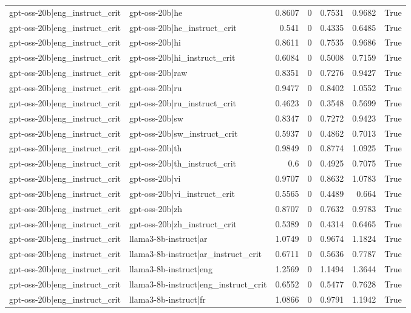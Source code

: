 \begin{table}
\begin{tabular}{l l r r r r l}
gpt-oss-20b|eng_instruct_crit & gpt-oss-20b|he & 0.8607 & 0 & 0.7531 & 0.9682 & True \\
gpt-oss-20b|eng_instruct_crit & gpt-oss-20b|he_instruct_crit & 0.541 & 0 & 0.4335 & 0.6485 & True \\
gpt-oss-20b|eng_instruct_crit & gpt-oss-20b|hi & 0.8611 & 0 & 0.7535 & 0.9686 & True \\
gpt-oss-20b|eng_instruct_crit & gpt-oss-20b|hi_instruct_crit & 0.6084 & 0 & 0.5008 & 0.7159 & True \\
gpt-oss-20b|eng_instruct_crit & gpt-oss-20b|raw & 0.8351 & 0 & 0.7276 & 0.9427 & True \\
gpt-oss-20b|eng_instruct_crit & gpt-oss-20b|ru & 0.9477 & 0 & 0.8402 & 1.0552 & True \\
gpt-oss-20b|eng_instruct_crit & gpt-oss-20b|ru_instruct_crit & 0.4623 & 0 & 0.3548 & 0.5699 & True \\
gpt-oss-20b|eng_instruct_crit & gpt-oss-20b|sw & 0.8347 & 0 & 0.7272 & 0.9423 & True \\
gpt-oss-20b|eng_instruct_crit & gpt-oss-20b|sw_instruct_crit & 0.5937 & 0 & 0.4862 & 0.7013 & True \\
gpt-oss-20b|eng_instruct_crit & gpt-oss-20b|th & 0.9849 & 0 & 0.8774 & 1.0925 & True \\
gpt-oss-20b|eng_instruct_crit & gpt-oss-20b|th_instruct_crit & 0.6 & 0 & 0.4925 & 0.7075 & True \\
gpt-oss-20b|eng_instruct_crit & gpt-oss-20b|vi & 0.9707 & 0 & 0.8632 & 1.0783 & True \\
gpt-oss-20b|eng_instruct_crit & gpt-oss-20b|vi_instruct_crit & 0.5565 & 0 & 0.4489 & 0.664 & True \\
gpt-oss-20b|eng_instruct_crit & gpt-oss-20b|zh & 0.8707 & 0 & 0.7632 & 0.9783 & True \\
gpt-oss-20b|eng_instruct_crit & gpt-oss-20b|zh_instruct_crit & 0.5389 & 0 & 0.4314 & 0.6465 & True \\
gpt-oss-20b|eng_instruct_crit & llama3-8b-instruct|ar & 1.0749 & 0 & 0.9674 & 1.1824 & True \\
gpt-oss-20b|eng_instruct_crit & llama3-8b-instruct|ar_instruct_crit & 0.6711 & 0 & 0.5636 & 0.7787 & True \\
gpt-oss-20b|eng_instruct_crit & llama3-8b-instruct|eng & 1.2569 & 0 & 1.1494 & 1.3644 & True \\
gpt-oss-20b|eng_instruct_crit & llama3-8b-instruct|eng_instruct_crit & 0.6552 & 0 & 0.5477 & 0.7628 & True \\
gpt-oss-20b|eng_instruct_crit & llama3-8b-instruct|fr & 1.0866 & 0 & 0.9791 & 1.1942 & True \\

\end{tabular}
\end{table}
